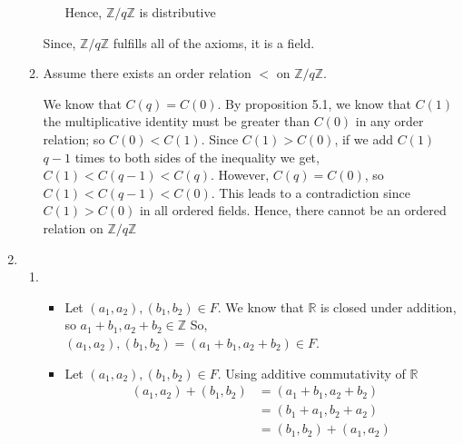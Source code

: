 \documentclass[12pt]{article}
\begin{document}
\begin{enumerate}[start=1,label={\bfseries Problem \arabic*:},leftmargin=1in]
\begin{enumerate}
\begin{itemize}
            Hence, $\mathbb{Z}/q\mathbb{Z}$ is distributive
        \end{itemize}
        Since, $\mathbb{Z}/q\mathbb{Z}$ fulfills all of the axioms, it is a field. 
        \item Assume there exists an order relation $<$ on $\mathbb{Z}/q\mathbb{Z}$. 
        
        We know that $C(q) = C(0)$. By proposition 5.1, we know that $C(1)$ the multiplicative identity must be greater than $C(0)$ in any order relation; so $C(0) < C(1)$.  
        Since $C(1) > C(0)$, if we add $C(1)$ $q-1$ times to both sides of the inequality we get, 
        $C(1) < C(q-1) < C(q)$. However, $C(q) = C(0)$, so $C(1) < C(q-1) < C(0)$. This leads to a contradiction since $C(1) > C(0)$ in all ordered fields. Hence, there cannot be an ordered relation on $\mathbb{Z}/q\mathbb{Z}$
    \end{enumerate}
    \item \begin{enumerate}
        \item \begin{itemize}
            \item Let $(a_{1}, a_{2}), (b_{1}, b_{2}) \in F$. We know that $\mathbb{R}$ is closed under addition, so $a_{1} + b_{1}, a_{2} + b_{2} \in \mathbb{Z}$ 
            So, $(a_{1}, a_{2}), (b_{1}, b_{2}) = (a_{1} + b_{1}, a_{2} + b_{2}) \in F$. 
            \item Let $(a_{1}, a_{2}), (b_{1}, b_{2}) \in F$. Using additive commutativity of $\mathbb{R}$
            \begin{align*}
                (a_{1}, a_{2}) + (b_{1}, b_{2}) &= (a_{1} + b_{1}, a_{2} + b_{2}) \\ 
                &= (b_{1} + a_{1}, b_{2} +  a_{2}) \\ 
                &= (b_{1}, b_{2}) + (a_{1}, a_{2})
            \end{align*}
 

\end{itemize}
\end{enumerate}
\end{enumerate}
\end{document}
